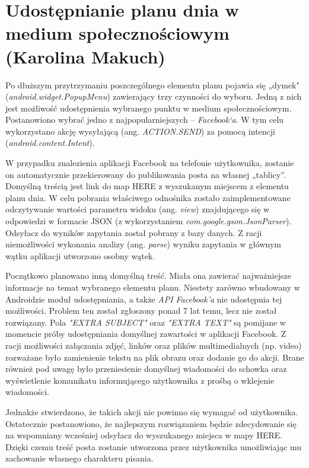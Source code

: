 \documentclass[10pt,twoside,a4paper]{report}
\begin{document}
\section{Udostępnianie planu dnia w medium społecznościowym (Karolina Makuch)}
\par  Po dłuższym przytrzymaniu poszczególnego elementu planu pojawia się „dymek"  (\textit{android.widget.PopupMenu}) zawierający trzy czynności do wyboru. Jedną z nich jest możliwość udostępnienia wybranego punktu w medium społecznościowym. Postanowiono wybrać jedno z najpopularniejszych – \textit{Facebook‘a}. W tym celu wykorzystano akcję wysyłającą (ang. \textit{ACTION.SEND}) za pomocą intencji (\textit{android.content.Intent}).
\par  W przypadku znalezienia aplikacji Facebook na telefonie użytkownika, zostanie on automatycznie przekierowany do publikowania posta na własnej „tablicy”. Domyślną treścią jest link do map HERE z wyszukanym miejscem z elementu planu dnia. W celu pobrania właściwego odnośnika  zostało zaimplementowane odczytywanie wartości parametru widoku (ang. \textit{view}) znajdującego się w odpowiedzi w formacie JSON (z wykorzystaniem \textit{com.google.gson.JsonParser}). Odsyłacz do wyników zapytania został pobrany z bazy danych. Z racji niemożliwości wykonania analizy (ang. \textit{parse}) wyniku zapytania w głównym wątku aplikacji utworzono osobny wątek.
\par Początkowo planowano inną domyślną treść. Miała ona zawierać najważniejsze informacje na temat wybranego elementu planu. Niestety zarówno wbudowany w Androidzie moduł  udostępniania, a także \textit{API Facebook’a} nie udostępnia tej możliwości.  Problem ten został zgłoszony ponad 7 lat temu, lecz nie został rozwiązany\cite{FacebookBug}. Pola \textit{"EXTRA SUBJECT"} oraz \textit{"EXTRA TEXT"} są pomijane w momencie próby udostępniania domyślnej zawartości w aplikacji Facebook. Z racji możliwości załączania zdjęć, linków oraz plików multimedialnych (np. video) rozważane było zamienienie tekstu na plik obrazu oraz dodanie go do akcji. Brane również pod uwagę było przeniesienie domyślnej wiadomości do schowka oraz wyświetlenie komunikatu informującego użytkownika z prośbą o wklejenie wiadomości.
\par Jednakże stwierdzono, że takich akcji nie powinno się wymagać od użytkownika. Ostatecznie postanowiono, że najlepszym rozwiązaniem będzie zdecydowanie się na wspomniany wcześniej odsyłacz do wyszukanego miejsca w mapy HERE\cite{mobileHere}. Dzięki czemu treść posta zostanie utworzona przez użytkownika umożliwiając mu zachowanie własnego charakteru pisania.
\end{document}
